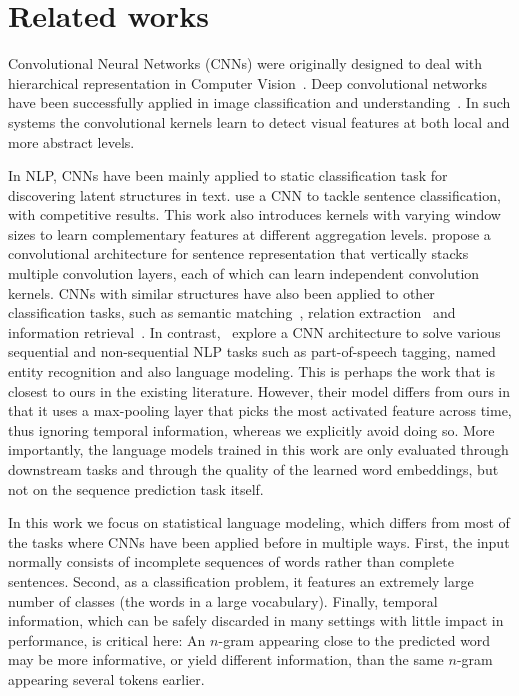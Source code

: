 \section{Related works}

Convolutional Neural Networks (CNNs) were originally designed to deal
with hierarchical representation in Computer
Vision~\cite{lecun1995convolutional}. Deep convolutional networks have
been successfully applied in image classification and
understanding~\cite{karen2014vgg,kaiming2015resnet}. In such systems
the convolutional kernels learn to detect visual features at both
local and more abstract levels.

In NLP, CNNs have been mainly applied to static classification task 
for discovering latent structures in text.  use a
CNN to tackle sentence classification, with competitive results. This
work also introduces kernels with varying window sizes to learn
complementary features at different aggregation
levels.  propose a convolutional
architecture for sentence representation that vertically stacks
multiple convolution layers, each of which can learn independent
convolution kernels. CNNs with similar structures have also been
applied to other classification tasks, such as semantic
matching~\cite{hu2014convolutional},
relation extraction~\cite{nguyen2015relation} and information
retrieval~\cite{shen2014latent}.  In
contrast,~ explore a CNN architecture to
solve various sequential and non-sequential NLP tasks such as
part-of-speech tagging, named entity recognition and also language
modeling. This is perhaps the work that is closest to ours in the
existing literature. However, their model differs from ours in that it
uses a max-pooling layer that picks the most activated feature across
time, thus ignoring temporal information, whereas we explicitly avoid
doing so. More importantly, the language models trained in this work are only
evaluated through downstream tasks and through the quality of the
learned word embeddings, but not on the sequence prediction task
itself.

In this work we focus on statistical language modeling, which differs
from most of the tasks where CNNs have been applied before in multiple ways. First,
the input normally consists of incomplete sequences of words rather
than complete sentences. Second, as a classification problem, it
features an extremely large number of classes (the words in a large
vocabulary). Finally, temporal information, which can be safely
discarded in many settings with little impact in performance, is
critical here: An $n$-gram appearing close to the predicted word may
be more informative, or yield different information, than the same
$n$-gram appearing several tokens earlier.

